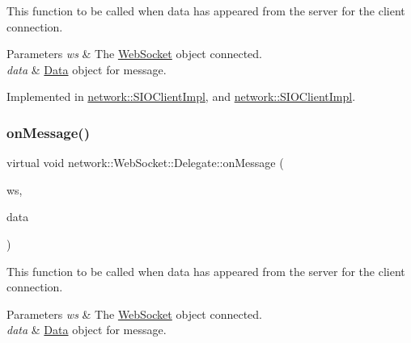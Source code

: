 This function to be called when data has appeared from the server for the client connection.


\begin{DoxyParams}{Parameters}
{\em ws} & The \hyperlink{classnetwork_1_1WebSocket}{Web\+Socket} object connected. \\
\hline
{\em data} & \hyperlink{structnetwork_1_1WebSocket_1_1Data}{Data} object for message. \\
\hline
\end{DoxyParams}


Implemented in \hyperlink{classnetwork_1_1SIOClientImpl_a7355f331dda0c87bd3d0eb9e3b0784c6}{network\+::\+S\+I\+O\+Client\+Impl}, and \hyperlink{classnetwork_1_1SIOClientImpl_a73369054407916b5a13c9e4c0501d547}{network\+::\+S\+I\+O\+Client\+Impl}.

\mbox{\label{classnetwork_1_1WebSocket_1_1Delegate_a879c2f96e39ce8d68e4fbc2827ea4377}} 
\subsubsection{\texorpdfstring{on\+Message()}{onMessage()}\hspace{0.1cm}{\footnotesize\ttfamily [2/2]}}
{\footnotesize\ttfamily virtual void network\+::\+Web\+Socket\+::\+Delegate\+::on\+Message (\begin{DoxyParamCaption}\item[{\hyperlink{classnetwork_1_1WebSocket}{Web\+Socket} $\ast$}]{ws,  }\item[{const \hyperlink{structnetwork_1_1WebSocket_1_1Data}{Data} \&}]{data }\end{DoxyParamCaption})\hspace{0.3cm}{\ttfamily [pure virtual]}}

This function to be called when data has appeared from the server for the client connection.


\begin{DoxyParams}{Parameters}
{\em ws} & The \hyperlink{classnetwork_1_1WebSocket}{Web\+Socket} object connected. \\
\hline
{\em data} & \hyperlink{structnetwork_1_1WebSocket_1_1Data}{Data} object for message. \\
\hline
\end{DoxyParams}


